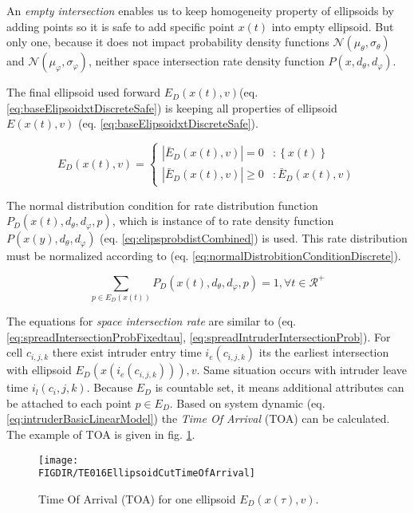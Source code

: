 \noindent An \emph{empty intersection} enables us to keep homogeneity property of ellipsoids by adding points so it is safe to add specific point ${x}(t)$ into empty ellipsoid. But only one, because it does not impact  probability density functions $\mathscr{N}(\mu_\theta,\sigma_\theta)$ and $\mathscr{N}(\mu_\varphi,\sigma_\varphi)$, neither space intersection rate  density function $P({x},d_\theta,d_\varphi)$. 

The final ellipsoid used forward $E_D({x}(t),{v})$(eq. \ref{eq:baseElipsoidxtDiscreteSafe}) is keeping all properties of ellipsoid $E({x}(t),{v})$ (eq. \ref{eq:baseElipsoidxtDiscreteSafe}). 

\begin{equation}\label{eq:baseElipsoidxtDiscreteSafe}
    E_D({x}(t),{v})= 
    \begin{cases}
        |\bar{E}_D({x}(t),{v})|=0 &: \left\{{x}(t)\right\} \\
        |\bar{E}_D({x}(t),{v})|\ge0 &: \bar{E}_D({x}(t),{v}) 
    \end{cases}
\end{equation}

\noindent The normal distribution condition for rate distribution function $P_D({x}(t),d_\theta,d_\varphi,{p})$, which is instance of to rate density function $P({x}(y),d_\theta,d_\varphi)$ (eq. \ref{eq:elipsprobdistCombined}) is used. This rate distribution must be normalized according to (eq.  \ref{eq:normalDistrobitionConditionDiscrete}).

\begin{equation}\label{eq:normalDistrobitionConditionDiscrete}
    \sum_{{p} \in E_D({x}(t))} P_D({x}(t),d_\theta,d_\varphi,{p}) = 1,\forall t\in\mathscr{R}^+
\end{equation}

\noindent The equations for \emph{space intersection rate} are similar to (eq. \ref{eq:spreadIntersectionProbFixedtau}, \ref{eq:spreadIntruderIntersectionProb}). For cell $c_{i,j,k}$ there exist intruder entry time $i_e(c_{i,j,k})$ its the earliest intersection with ellipsoid $E_D({x}(i_e(c_{i,j,k}))),{v}$. Same situation occurs with intruder leave time $i_l(c_i,j,k)$. Because $E_D$ is countable set, it means additional attributes can be attached to each point ${p}\in E_D$. Based on system dynamic (eq. \ref{eq:intruderBasicLinearModel}) the \emph{Time Of Arrival} (TOA) can be calculated. The example of TOA is given in fig. \ref{fig:intruderTimeOfArrival}.

\begin{figure}[H]
    \centering
    \texttt{[image: \\FIGDIR/TE016EllipsoidCutTimeOfArrival]} 
    \caption{Time Of Arrival (TOA) for one ellipsoid $E_D({x}(\tau),{v})$.}
    \label{fig:intruderTimeOfArrival}
\end{figure}

